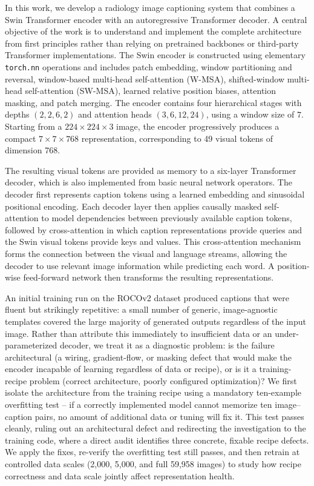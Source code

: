 \documentclass[conference]{IEEEtran}
\begin{document}
In this work, we develop a radiology image captioning system that combines a Swin Transformer encoder with an autoregressive Transformer decoder. A central objective of the work is to understand and implement the complete architecture from first principles rather than relying on pretrained backbones or third-party Transformer implementations. The Swin encoder is constructed using elementary \texttt{torch.nn} operations and includes patch embedding, window partitioning and reversal, window-based multi-head self-attention (W-MSA), shifted-window multi-head self-attention (SW-MSA), learned relative position biases, attention masking, and patch merging. The encoder contains four hierarchical stages with depths $(2,2,6,2)$ and attention heads $(3,6,12,24)$, using a window size of $7$. Starting from a $224\times224\times3$ image, the encoder progressively produces a compact $7\times7\times768$ representation, corresponding to 49 visual tokens of dimension 768.

The resulting visual tokens are provided as memory to a six-layer Transformer decoder, which is also implemented from basic neural network operators. The decoder first represents caption tokens using a learned embedding and sinusoidal positional encoding. Each decoder layer then applies causally masked self-attention to model dependencies between previously available caption tokens, followed by cross-attention in which caption representations provide queries and the Swin visual tokens provide keys and values. This cross-attention mechanism forms the connection between the visual and language streams, allowing the decoder to use relevant image information while predicting each word. A position-wise feed-forward network then transforms the resulting representations.

An initial training run on the ROCOv2 dataset produced captions that were fluent but strikingly repetitive: a small number of generic, image-agnostic templates covered the large majority of generated outputs regardless of the input image. Rather than attribute this immediately to insufficient data or an under-parameterized decoder, we treat it as a diagnostic problem: is the failure architectural (a wiring, gradient-flow, or masking defect that would make the encoder incapable of learning regardless of data or recipe), or is it a training-recipe problem (correct architecture, poorly configured optimization)? We first isolate the architecture from the training recipe using a mandatory ten-example overfitting test -- if a correctly implemented model cannot memorize ten image--caption pairs, no amount of additional data or tuning will fix it. This test passes cleanly, ruling out an architectural defect and redirecting the investigation to the training code, where a direct audit identifies three concrete, fixable recipe defects. We apply the fixes, re-verify the overfitting test still passes, and then retrain at controlled data scales (2,000, 5,000, and full 59,958 images) to study how recipe correctness and data scale jointly affect representation health.
\end{document}

